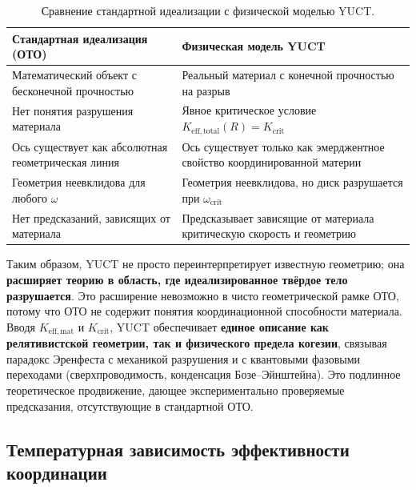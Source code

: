 \documentclass[12pt,a4paper]{article}
\newcommand{\Keffmat}{K_{\mathrm{eff,mat}}}
\newcommand{\Kefftot}{K_{\mathrm{eff,total}}}
\newcommand{\Kcrit}{K_{\mathrm{crit}}}
\begin{document}
	\begin{table}[h]
		\centering
		\caption{Сравнение стандартной идеализации с физической моделью YUCT.}
		\label{tab:idealization}
		\begin{tabular}{p{5cm}p{5cm}}
			\toprule
			\textbf{Стандартная идеализация (ОТО)} & \textbf{Физическая модель YUCT} \\
			\midrule
			Математический объект с бесконечной прочностью & Реальный материал с конечной прочностью на разрыв \\
			Нет понятия разрушения материала & Явное критическое условие \(\Kefftot(R) = \Kcrit\) \\
			Ось существует как абсолютная геометрическая линия & Ось существует только как эмерджентное свойство координированной материи \\
			Геометрия неевклидова для любого \(\omega\) & Геометрия неевклидова, но диск разрушается при \(\omega_{\text{crit}}\) \\
			Нет предсказаний, зависящих от материала & Предсказывает зависящие от материала критическую скорость и геометрию \\
			\bottomrule
		\end{tabular}
	\end{table}
	
	Таким образом, YUCT не просто переинтерпретирует известную геометрию; она \textbf{расширяет теорию в область, где идеализированное твёрдое тело разрушается}. Это расширение невозможно в чисто геометрической рамке ОТО, потому что ОТО не содержит понятия координационной способности материала. Вводя \(\Keffmat\) и \(\Kcrit\), YUCT обеспечивает \textbf{единое описание как релятивистской геометрии, так и физического предела когезии}, связывая парадокс Эренфеста с механикой разрушения и с квантовыми фазовыми переходами (сверхпроводимость, конденсация Бозе–Эйнштейна). Это подлинное теоретическое продвижение, дающее экспериментально проверяемые предсказания, отсутствующие в стандартной ОТО.
	
	\subsection{Температурная зависимость эффективности координации}
	
\end{document}
